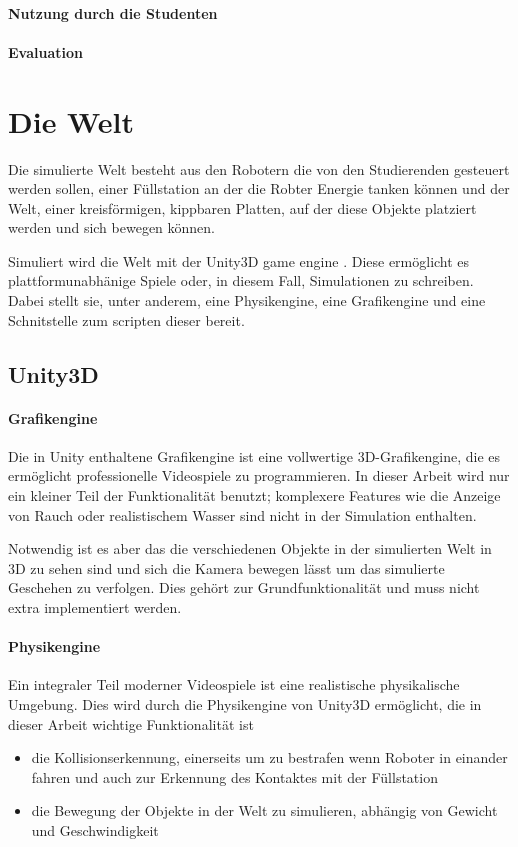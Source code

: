 \documentclass[
    12pt,
    bibliography=totoc,
    ngerman
]{scrartcl}
\begin{document}

\paragraph{Nutzung durch die Studenten} 

\paragraph{Evaluation}

\clearpage
\section{Die Welt}
Die simulierte Welt besteht aus den Robotern die von den Studierenden gesteuert werden sollen, einer F{\"{u}}llstation an der die Robter Energie tanken k{\"{o}}nnen und
der Welt, einer kreisf{\"{o}}rmigen, kippbaren Platten, auf der diese Objekte platziert werden und sich bewegen k{\"{o}}nnen.

Simuliert wird die Welt mit der Unity3D game engine . Diese erm{\"{o}}glicht es plattformunabh{\"{a}}nige Spiele oder, in diesem Fall, Simulationen zu schreiben.
Dabei stellt sie, unter anderem, eine Physikengine, eine Grafikengine und eine Schnitstelle zum scripten dieser bereit. 

\subsection{Unity3D}
\paragraph{Grafikengine}
Die in Unity enthaltene Grafikengine ist eine vollwertige 3D-Grafikengine, die es erm{\"{o}}glicht professionelle Videospiele zu programmieren. In dieser Arbeit wird nur
ein kleiner Teil der Funktionalit{\"{a}}t benutzt; komplexere Features wie die Anzeige von Rauch oder realistischem Wasser sind nicht in der Simulation enthalten.

Notwendig ist es aber das die verschiedenen Objekte in der simulierten Welt in 3D zu sehen sind und sich die Kamera bewegen l{\"{a}}sst um das simulierte Geschehen zu
verfolgen. Dies geh{\"{o}}rt zur Grundfunktionalit{\"{a}}t und muss nicht extra implementiert werden.

\paragraph{Physikengine}
Ein integraler Teil moderner Videospiele ist eine realistische physikalische Umgebung. Dies wird durch die Physikengine von Unity3D erm{\"{o}}glicht, die in dieser
Arbeit wichtige Funktionalit{\"{a}}t ist
\begin{itemize}
\item die Kollisionserkennung, einerseits um zu bestrafen wenn Roboter in einander fahren und auch zur Erkennung des Kontaktes mit der F{\"{u}}llstation
\item die Bewegung der Objekte in der Welt zu simulieren, abh{\"{a}}ngig von Gewicht und Geschwindigkeit
\end{itemize}
\end{document}

